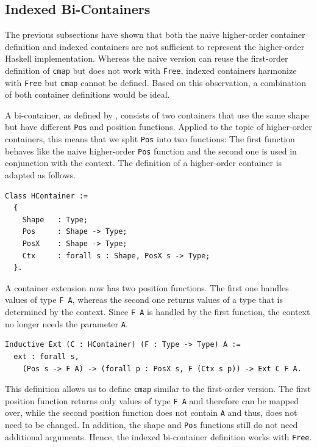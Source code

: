 \documentclass[a4paper, 11pt, fleqn, twoside]{scrreprt}
\newcommand{\cinl}[1]{\texttt{#1}}
\begin{document}
\subsection{Indexed Bi-Containers}
The previous subsections have shown that both the naive higher-order container definition and indexed containers are not sufficient to represent the higher-order Haskell implementation.
Whereas the naive version can reuse the first-order definition of \cinl{cmap} but does not work with \cinl{Free}, indexed containers harmonize with \cinl{Free} but \cinl{cmap} cannot be defined.
Based on this observation, a combination of both container definitions would be ideal.

A bi-container, as defined by \citet{ghani2007higherDimensional}, consists of two containers that use the same shape but have different \cinl{Pos} and position functions.
Applied to the topic of higher-order containers, this means that we split \cinl{Pos} into two functions: The first function behaves like the naive higher-order \cinl{Pos} function and the second one is used in conjunction with the context.
The definition of a higher-order container is adapted as follows.

\begin{verbatim}
Class HContainer :=
  {
    Shape   : Type;
    Pos     : Shape -> Type;
    PosX    : Shape -> Type;
    Ctx     : forall s : Shape, PosX s -> Type;
  }.
\end{verbatim}

A container extension now has two position functions.
The first one handles values of type \cinl{F A}, whereas the second one returns values of a type that is determined by the context.
Since \cinl{F A} is handled by the first function, the context no longer needs the parameter \cinl{A}.

\begin{verbatim}
Inductive Ext (C : HContainer) (F : Type -> Type) A :=
  ext : forall s, 
    (Pos s -> F A) -> (forall p : PosX s, F (Ctx s p)) -> Ext C F A.
\end{verbatim}

This definition allows us to define \cinl{cmap} similar to the first-order version.
The first position function returns only values of type \cinl{F A} and therefore can be mapped over, while the second position function does not contain \cinl{A} and thus, does not need to be changed.
In addition, the shape and \cinl{Pos} functions still do not need additional arguments.
Hence, the indexed bi-container definition works with \cinl{Free}.
\end{document}
